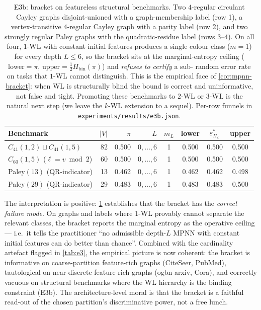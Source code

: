 \documentclass[10pt]{article}
\theoremstyle{definition}
\theoremstyle{remark}
\newcommand{\eps}{\varepsilon}
\begin{document}
\begin{table}[h]\centering\small
\begin{tabular}{lrrrcccc}
\toprule
Benchmark & $|V|$ & $\pi$ & $L$ & $m_{L}$ & lower
          & $\eps^{*}_{\Pi_{L}}$ & upper \\
\midrule
$C_{41}(1,2) \sqcup C_{41}(1,5)$
        & 82 & 0.500 & $0,\ldots,6$ & 1 & 0.500 & 0.500 & 0.500 \\
$C_{60}(1,5)$ ($\ell = v \bmod 2$)
        & 60 & 0.500 & $0,\ldots,6$ & 1 & 0.500 & 0.500 & 0.500 \\
Paley$(13)$ (QR-indicator)
        & 13 & 0.462 & $0,\ldots,6$ & 1 & 0.462 & 0.462 & 0.498 \\
Paley$(29)$ (QR-indicator)
        & 29 & 0.483 & $0,\ldots,6$ & 1 & 0.483 & 0.483 & 0.500 \\
\bottomrule
\end{tabular}
\caption{E3b: bracket on featureless structural benchmarks. Two
$4$-regular circulant Cayley graphs disjoint-unioned with a
graph-membership label (row 1), a vertex-transitive $4$-regular
Cayley graph with a parity label (row 2), and two strongly
regular Paley graphs with the quadratic-residue label (rows
$3$--$4$). On all four, $1$-WL with constant initial features
produces a single colour class ($m = 1$) for every depth
$L \le 6$, so the bracket sits at the marginal-entropy ceiling
($\mathrm{lower} = \pi$, $\mathrm{upper} = \tfrac{1}{2}
H_{\mathrm{bin}}(\pi)$) and \emph{refuses to certify} a sub-
random error rate on tasks that $1$-WL cannot distinguish. This
is the empirical face of \cref{cor:mpnn-bracket}: when WL is
structurally blind the bound is correct and uninformative, not
false and tight. Promoting these benchmarks to $2$-WL or $3$-WL
is the natural next step (we leave the $k$-WL extension to a
sequel). Per-row funnels in \texttt{experiments/results/e3b.json}.}
\label{tab:e3b}
\end{table}

The interpretation is positive: \cref{tab:e3b} establishes that
the bracket has the \emph{correct failure mode}. On graphs and
labels where $1$-WL provably cannot separate the relevant
classes, the bracket reports the marginal entropy as the
operative ceiling --- i.e.\ it tells the practitioner ``no
admissible depth-$L$ MPNN with constant initial features can do
better than chance''. Combined with the cardinality artefact
flagged in \cref{tab:e3}, the empirical picture is now coherent:
the bracket is informative on coarse-partition feature-rich
graphs (CiteSeer, PubMed), tautological on near-discrete
feature-rich graphs (ogbn-arxiv, Cora), and correctly vacuous
on structural benchmarks where the WL hierarchy is the binding
constraint (E3b). The architecture-level moral is that the
bracket is a faithful read-out of the chosen partition's
discriminative power, not a free lunch.
\end{document}
